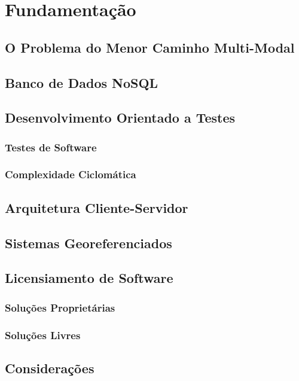 
\chapter{Fundamentação}

\section{O Problema do Menor Caminho Multi-Modal}

\section{Banco de Dados NoSQL}

\section{Desenvolvimento Orientado a Testes}

\subsection{Testes de Software}

\subsection{Complexidade Ciclomática}

\section{Arquitetura Cliente-Servidor}

\section{Sistemas Georeferenciados}

\section{Licensiamento de Software}

\subsection{Soluções Proprietárias}

\subsection{Soluções Livres}

\section{Considerações}


